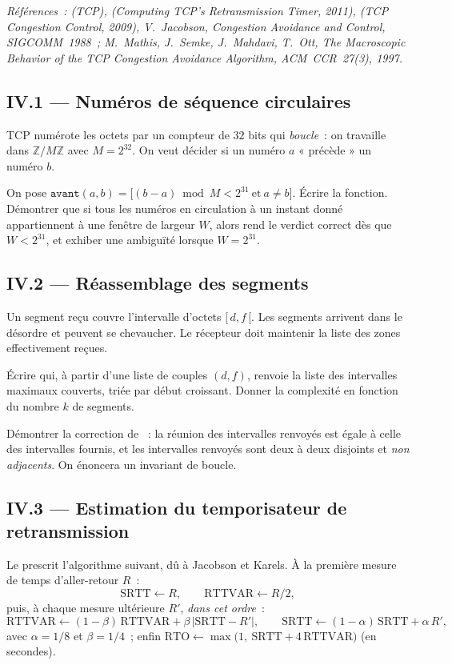\documentclass[11pt,a4paper]{article}
\begin{document}
\emph{Références~:  (TCP),  (\emph{Computing TCP's Retransmission
Timer}, 2011),  (\emph{TCP Congestion Control}, 2009), V.~Jacobson,
\emph{Congestion Avoidance and Control}, SIGCOMM~1988~; M.~Mathis, J.~Semke, J.~Mahdavi,
T.~Ott, \emph{The Macroscopic Behavior of the TCP Congestion Avoidance Algorithm},
ACM~CCR~27(3), 1997.}

\subsection*{IV.1 --- Numéros de séquence circulaires}

TCP numérote les octets par un compteur de $32$ bits qui \emph{boucle}~: on travaille dans
$\mathbb{Z}/M\mathbb{Z}$ avec $M=2^{32}$. On veut décider si un numéro $a$ « précède » un
numéro $b$.

\Q On pose $\texttt{avant}(a,b) = \big[(b-a)\bmod M < 2^{31}\ \text{et}\ a\ne b\big]$.
Écrire la fonction. Démontrer que si tous les numéros en circulation à un instant donné
appartiennent à une fenêtre de largeur $W$, alors  rend le verdict correct dès
que $W<2^{31}$, et exhiber une ambiguïté lorsque $W=2^{31}$.

\subsection*{IV.2 --- Réassemblage des segments}

Un segment reçu couvre l'intervalle d'octets $[\,d,f\,[$. Les segments arrivent dans le
désordre et peuvent se chevaucher. Le récepteur doit maintenir la liste des zones
effectivement reçues.

\Q Écrire  qui, à partir d'une liste de couples $(d,f)$, renvoie la
liste des intervalles maximaux couverts, triée par début croissant. Donner la complexité en
fonction du nombre $k$ de segments.

\Q Démontrer la correction de ~: la réunion des intervalles renvoyés est
égale à celle des intervalles fournis, et les intervalles renvoyés sont deux à deux disjoints
et \emph{non adjacents}. On énoncera un invariant de boucle.

\subsection*{IV.3 --- Estimation du temporisateur de retransmission}

Le  prescrit l'algorithme suivant, dû à Jacobson et Karels. À la première mesure
de temps d'aller-retour $R$~:
\[ \mathrm{SRTT}\leftarrow R,\qquad \mathrm{RTTVAR}\leftarrow R/2, \]
puis, à chaque mesure ultérieure $R'$, \emph{dans cet ordre}~:
\[ \mathrm{RTTVAR}\leftarrow(1-\beta)\,\mathrm{RTTVAR}+\beta\,|\mathrm{SRTT}-R'|,\qquad
   \mathrm{SRTT}\leftarrow(1-\alpha)\,\mathrm{SRTT}+\alpha\,R', \]
avec $\alpha=1/8$ et $\beta=1/4$~; enfin
$\mathrm{RTO}\leftarrow\max\big(1,\ \mathrm{SRTT}+4\,\mathrm{RTTVAR}\big)$ (en secondes).
\end{document}
